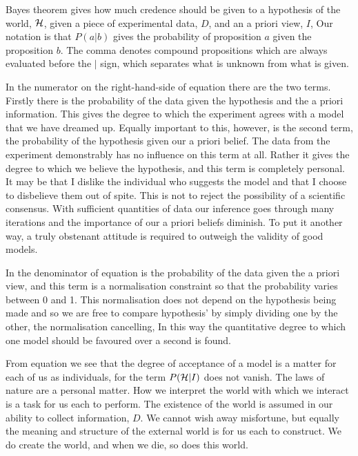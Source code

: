 Bayes theorem gives how much credence should be given to a hypothesis of
the world, ${\cal H}$,
given a piece of experimental data, $D$, and an a priori view, $I$,
Our notation is that $P(a|b)$ gives the probability of proposition $a$
given the proposition
$b$.
The comma denotes compound propositions which are always evaluated
before the $|$ sign, which separates what is unknown from what is given.


In the numerator on the right-hand-side of equation  there are the
two terms.
Firstly there is the  probability of the data given the hypothesis and the a
priori information.
This gives the degree to which the experiment agrees with a model that
we have dreamed up.
Equally important to this, however,
is the second term, 
the probability of the hypothesis given our a priori belief.
The data from the experiment demonstrably has no influence
on this term at all.
Rather it gives the degree to which we believe the hypothesis,
and this term is completely personal.
It may be that I dislike the individual who suggests the model and that I
choose to disbelieve them out of spite.
This is not to reject the possibility of a scientific consensus.
With sufficient quantities of data our inference goes through many
iterations and the importance of our a priori beliefs diminish.
To put it another way,
a truly obstenant attitude is required to outweigh the validity of
good models.

In the denominator of equation  is  the probability of the data given the a priori view,
and this term is a normalisation constraint so that the  probability varies between
0 and 1.
This normalisation does not depend on the hypothesis being made and so
we are free to compare hypothesis' by simply dividing one by the
other, 
the normalisation cancelling,
In this way the quantitative degree to which one model should be favoured
over a second is found.

From equation  we see that the degree of acceptance
of a model is a matter for 
each of us as individuals, for 
the term $P({\cal H}|I)$ does not vanish.
The laws of nature are a personal matter.
How we interpret the  world with which we interact is a task for
us each to perform.
The existence of the world is assumed in our ability to
collect information, $D$.
We cannot wish away misfortune,
but equally the meaning and structure of the external world is for us each
to construct. 
We do create the world, 
and when we die, so does this world. %

